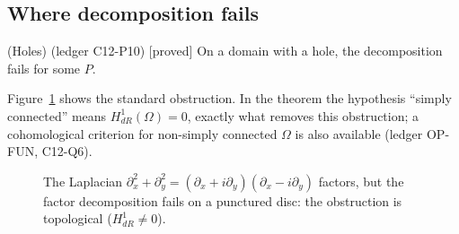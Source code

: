 \documentclass[11pt,a4paper]{article}
\theoremstyle{definition}
\newcommand{\badge}[2]{\textcolor{#1}{\textsf{\footnotesize[#2]}}}
\newcommand{\proved}[1][]{\badge{cC}{proved#1}}
\newcommand{\led}[1]{\textcolor{cG}{\textsf{\footnotesize(ledger #1)}}}
\begin{document}
\subsection{Where decomposition fails}
\begin{proposition}{(Holes) \led{C12-P10} \proved[]}
On a domain with a hole, the decomposition fails for some $P$.
\end{proposition}
Figure~\ref{fig:hole} shows the standard obstruction. In the theorem the hypothesis ``simply connected'' means $H^1_{dR}(\Omega)=0$, exactly what removes this obstruction; a cohomological criterion for non-simply connected $\Omega$ is also available \led{OP-FUN, C12-Q6}.
\begin{figure}[!htb]
\centering
{}
\caption{The Laplacian $\partial_x^2+\partial_y^2=(\partial_x+i\partial_y)(\partial_x-i\partial_y)$ factors, but the factor decomposition fails on a punctured disc: the obstruction is topological ($H^1_{dR}\neq0$).}\label{fig:hole}
\end{figure}
\end{document}
